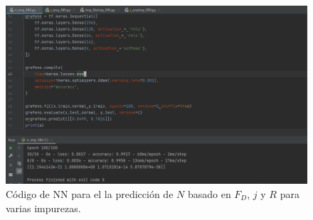 \documentclass{article}
\begin{document}
\begin{figure}[th!]
\centering
   \includegraphics[width=1.\textwidth]{n_Varias.png}
   \caption{Código de NN para el la predicción de $N$ basado en $F_D$, $j$ y $R$ para varias impurezas.}
\end{figure}
\end{document}
